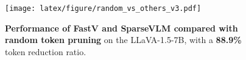 \begin{figure}[t]
    \centering
    \texttt{[image: latex/figure/random\_vs\_others\_v3.pdf]}
    \vspace{-6mm}
    \caption{\textbf{Performance of FastV and SparseVLM compared with random token pruning} on the LLaVA-1.5-7B, with a \textbf{88.9\%} token reduction ratio.}
    \vspace{-7mm}
    \label{fig:random_vs_others}
\end{figure}
